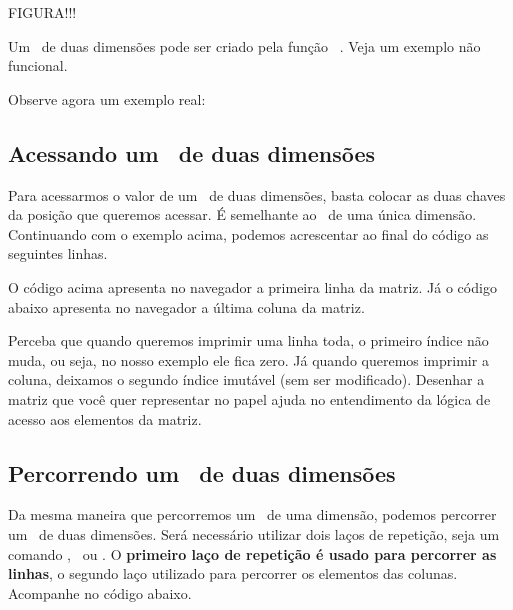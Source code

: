 FIGURA!!!

Um \tipoarray~de duas dimensões pode ser criado pela função \comandoarray~. Veja um exemplo
não funcional.



Observe agora um exemplo real:



\subsection{Acessando um \tipoarray~de duas dimensões}
\label{acessando-um-array-de-duas-dimensoes}

Para acessarmos o valor de um \tipoarray~de duas dimensões, basta colocar as 
duas chaves da posição que queremos acessar. É semelhante ao \tipoarray~de uma única dimensão.
Continuando com o exemplo acima, podemos acrescentar ao final do código as seguintes linhas.



O código acima apresenta no navegador a primeira linha da matriz. Já o código abaixo
apresenta no navegador a última coluna da matriz.



Perceba que quando queremos imprimir uma linha toda, o primeiro índice não muda, ou seja,
no nosso exemplo ele fica zero. Já quando queremos imprimir a coluna, deixamos o segundo
índice imutável (sem ser modificado). Desenhar a matriz que você quer representar no papel 
ajuda no entendimento da lógica de acesso aos elementos da matriz.

\subsection{Percorrendo um \tipoarray~de duas dimensões}
\label{percorrendo-um-array-de-duas-dimensoes}

Da mesma maneira que percorremos um \tipoarray~de uma dimensão, podemos percorrer um 
\tipoarray~de duas dimensões. Será necessário utilizar dois laços de repetição, seja
um comando \comandofor, \comandowhile~ou \comandoforeach. O \textbf{primeiro laço de repetição
é usado para percorrer as linhas}, o segundo laço utilizado para percorrer os elementos
das colunas. Acompanhe no código abaixo.

